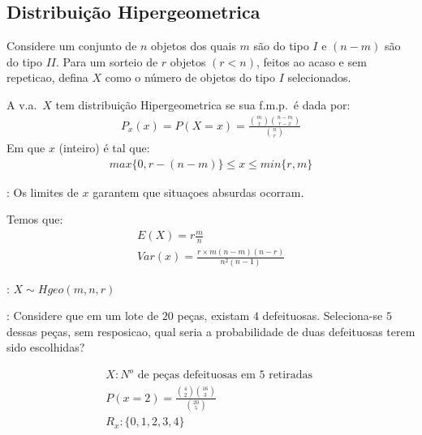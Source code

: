  \subsection{Distribuição Hipergeometrica}
\begin{description}
  \item
Considere um conjunto de $n$ objetos dos quais $m$ são do tipo $I$
e $(n-m) $ são do tipo $II$. Para um sorteio de $r$ objetos $(r<n)$, 
feitos ao acaso e sem repeticao, defina $X$ como o número de objetos do tipo
$I$ selecionados.
  \item[Definição:] A v.a.\ $X$ tem distribuição Hipergeometrica se sua f.m.p.\ é dada
    por:
    \begin{align*}
      P_x(x)= P(X=x)= \frac{\binom{m}{x} \binom{n-m}{r-x}}{\binom{n}{r}}
    \end{align*}
    Em que $x$ (inteiro) é tal que:
    \begin{align*}
      max \{0,r-(n-m)\} \leq x \leq min \{ r,m \}
    \end{align*}
  \item[Observação]: Os limites de $x$ garantem que situaçoes absurdas ocorram.
  \item Temos que: 
    \begin{align*}
      E(X) = r \frac{m}{n} \\
      Var(x)= \frac{r\times m (n-m)(n-r)}{n^2 (n-1)}
    \end{align*}
    \begin{figure}[H]
      \centering
      
      \caption{}
      \label{fig:x}
    \end{figure}
  \item[Notacao]: $X \mathtt{\sim} Hgeo (m,n,r)$
  \item[Exemplo]: Considere que em um lote de $20$ peças, existam $4$ defeituosas.
    Seleciona-se $5$ dessas peças, sem resposicao, qual seria a probabilidade 
    de duas defeituosas terem sido escolhidas?
\begin{figure}[H]
  \centering
  
  \label{fig:x2}
\end{figure}
    \begin{align*}
      X: \text{$N^{o}$  de peças defeituosas em $5$ retiradas }\\
      P(x=2)=\frac{\binom{4}{2} \binom{16}{3}}{\binom{20}{5}}\\
      R_{x}: \{ 0,1,2,3,4 \}
    \end{align*}
\end{description}
